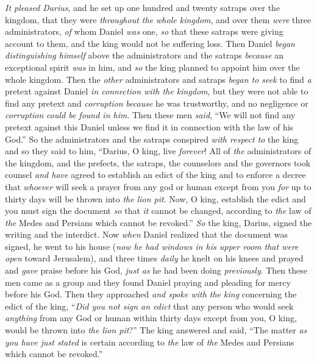 \begin{biblechapter} %
 \textit{It pleased Darius}, and he set up one hundred and twenty satraps over the kingdom, that they were \textit{throughout the whole kingdom},
\verse and over them \textit{were} three administrators, \textit{of} whom Daniel \textit{was} one, \textit{so} that these satraps were giving account to them, and the king would not be suffering loss.
\verse Then Daniel \textit{began distinguishing himself} above the administrators and the satraps \textit{because} an exceptional spirit \textit{was} in him, and \textit{so} the king planned to appoint him over the whole kingdom.
\verse Then the \textit{other} administrators and satraps \textit{began to seek} to find \textit{a} pretext against Daniel \textit{in connection with the kingdom}, but they were not able to find any pretext and \textit{corruption} \textit{because} he was trustworthy, and no negligence or \textit{corruption} \textit{could be found in him}.
\verse Then these men \textit{said}, “We will not find any pretext against this Daniel unless we find it in connection with the law of his God.”
\verse So the administrators and the satraps conspired \textit{with respect to} the king and so they said to him, “Darius, O king, live \textit{forever}!
\verse All of \textit{the} administrators of the kingdom, and the prefects, the satraps, the counselors and the governors took counsel \textit{and have} agreed to establish an edict of the king and to enforce a decree that \textit{whoever} will seek a prayer from any god or human except from you \textit{for} up to thirty days will be thrown into \textit{the lion pit}.
\verse Now, O king, establish the edict and you must sign the document \textit{so} that \textit{it} cannot be changed, according to \textit{the} law of \textit{the} Medes and Persians which cannot be revoked.”
\verse \textit{So} the king, Darius, signed the writing and the interdict.
\verse Now \textit{when} Daniel realized that the document was signed, he went to his house (\textit{now he had windows in his upper room that were open} toward Jerusalem), and three times \textit{daily} he knelt on his knees and prayed and \textit{gave} praise before his God, \textit{just as} he had been doing \textit{previously}.
\verse Then these men came as a group and they found Daniel praying and pleading for mercy before his God.
\verse Then they approached \textit{and spoke with the king} concerning the edict of the king, “\textit{Did you not sign an edict} that any person who would seek \textit{anything} from any God or human within thirty days except from you, O king, would be thrown into \textit{the lion pit}?” The king answered and said, “The matter \textit{as you have just stated} is certain according to \textit{the} law of \textit{the} Medes and Persians which cannot be revoked.”

\end{biblechapter}
